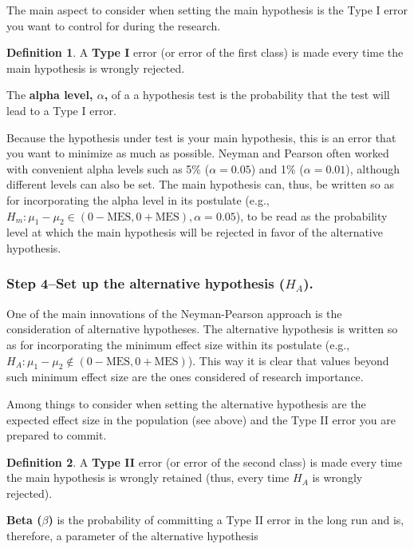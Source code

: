 \documentclass[
]{book}
\theoremstyle{definition}
\newtheorem{definition}{Definition}[chapter]
\theoremstyle{definition}
\theoremstyle{definition}
\theoremstyle{definition}
\theoremstyle{remark}
\begin{document}
The main aspect to consider when setting the main hypothesis is the Type I error you want to control for during the research.

\begin{definition}
A \textbf{Type I} error (or error of the first class) is made every time the main hypothesis is wrongly rejected.

The \textbf{alpha level, \(\alpha\),} of a a hypothesis test is the probability that the test will lead to a Type I error.
\end{definition}

Because the hypothesis under test is your main hypothesis, this is an error that you want to minimize as much as possible. Neyman and Pearson often worked with convenient alpha levels such as 5\% (\(\alpha = 0.05\)) and 1\% (\(\alpha= 0.01\)), although different levels can also be set. The main hypothesis can, thus, be written so as for incorporating the alpha level in its postulate (e.g., \(H_m: \mu_1-\mu_2 \in (0 - \mbox{MES}, 0 + \mbox{MES}), \alpha = 0.05\)), to be read as the probability level at which the main hypothesis will be rejected in favor of the alternative hypothesis.

\hypertarget{step-4set-up-the-alternative-hypothesis-h_a.}{%
\subsubsection*{\texorpdfstring{Step 4--Set up the alternative hypothesis (\(H_A\)).}{Step 4--Set up the alternative hypothesis (H\_A).}}\label{step-4set-up-the-alternative-hypothesis-h_a.}}

One of the main innovations of the Neyman-Pearson approach is the consideration of alternative hypotheses. The alternative hypothesis is written so as for incorporating the minimum effect size within its postulate (e.g., \(H_A: \mu_1-\mu_2 \notin (0 - \mbox{MES}, 0 + \mbox{MES})\)). This way it is clear that values beyond such minimum effect size are the ones considered of research importance.

Among things to consider when setting the alternative hypothesis are the expected effect size in the population (see above) and the Type II error you are prepared to commit.

\begin{definition}
A \textbf{Type II} error (or error of the second class) is made every time the main hypothesis is wrongly retained (thus, every time \(H_A\) is wrongly rejected).

\textbf{Beta (\(\beta\))} is the probability of committing a Type II error in the long run and is, therefore, a parameter of the alternative hypothesis
\end{definition}
\end{document}
